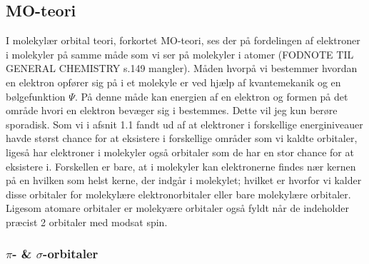 \documentclass[12pt,a4paper]{article}
\theoremstyle{break}
\theoremstyle{nonumberplain}
\begin{document}
\subsection{MO-teori}
I molekylær orbital teori, forkortet MO-teori, ses der på fordelingen af elektroner i molekyler på samme måde som vi ser på molekyler i atomer (FODNOTE TIL GENERAL CHEMISTRY s.149 mangler). Måden hvorpå vi bestemmer hvordan en elektron opfører sig på i et molekyle er ved hjælp af kvantemekanik og en bølgefunktion $\Psi$. På denne måde kan energien af en elektron og formen på det område hvori en elektron bevæger sig i bestemmes. Dette vil jeg kun berøre sporadisk. Som vi i afsnit 1.1 fandt ud af at elektroner i forskellige energiniveauer havde størst chance for at eksistere i forskellige områder som vi kaldte orbitaler, ligeså har elektroner i molekyler også orbitaler som de har en stor chance for at eksistere i. Forskellen er bare, at i molekyler kan elektronerne findes nær kernen på en hvilken som helst kerne, der indgår i molekylet; hvilket er hvorfor vi kalder disse orbitaler for molekylære elektronorbitaler eller bare molekylære orbitaler. 
Ligesom atomare orbitaler er molekyære orbitaler også fyldt når de indeholder præcist 2 orbitaler med modsat spin. 
\\

\subsubsection{$\pi$- \& $\sigma$-orbitaler}
\end{document}
